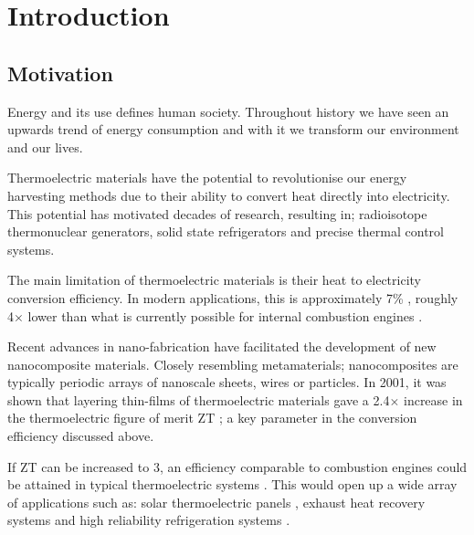 \documentclass[12pt,draft]{article}
\begin{document}
\pagebreak

\tableofcontents

\pagebreak


\pagestyle{fancy}

\section{Introduction}
 
\subsection{Motivation}
Energy and its use defines human society. Throughout history we have seen an upwards trend of energy consumption and with it we transform our environment and our lives.

Thermoelectric materials have the potential to revolutionise our energy harvesting methods due to their ability to convert heat directly into electricity. This potential has motivated decades of research, resulting in; radioisotope thermonuclear generators, solid state refrigerators and precise thermal control systems.

The main limitation of thermoelectric materials is their heat to electricity conversion efficiency. In modern applications, this is approximately 7\% \cite{modern-thermoelectrics}, roughly 4$\times$ lower than what is currently possible for internal combustion engines \cite{engine-efficiency}.

Recent advances in nano-fabrication have facilitated the development of new nanocomposite materials. Closely resembling metamaterials; nanocomposites are typically periodic arrays of nanoscale sheets, wires or particles. In 2001, it was shown that layering thin-films of thermoelectric materials gave a 2.4$\times$ increase in the thermoelectric figure of merit ZT \cite{nanocomposite-zt}; a key parameter in the conversion efficiency discussed above.

If ZT can be increased to 3, an efficiency comparable to combustion engines could be attained in typical thermoelectric systems \cite{liu-review}. This would open up a wide array of applications such as: solar thermoelectric panels \cite{solar-thermal}, exhaust heat recovery systems \cite{exhust-recovery} and high reliability refrigeration systems \cite{thermo-cooling}.
\end{document}
